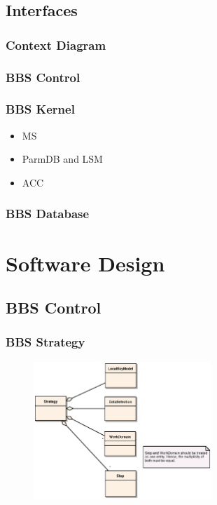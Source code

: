 \documentclass[10pt]{lofar}
\begin{document}
\subsection{Interfaces}
\label{subsec:sys-interfaces}

\subsubsection{Context Diagram}
\label{subsubsec:context}

\subsubsection{BBS Control}
\label{subsubsec:interf-control}

\subsubsection{BBS Kernel}
\label{subsubsec:interf-kernel}
\begin{itemize}
\item MS
\item ParmDB and LSM
\item ACC
\end{itemize}

\subsubsection{BBS Database}
\label{subsubsec:interf-database}

\pagebreak

\section{Software Design}
\label{sec:software-design}

\subsection{BBS Control}
\label{subsec:design-control}

\subsubsection{BBS Strategy}
\label{subsubsec:design-strategy}
\begin{figure}[!ht]
\centering
\includegraphics[width=0.6\textwidth]{images/bbs-strategy-class-diagram}
\end{figure}
\end{document}
